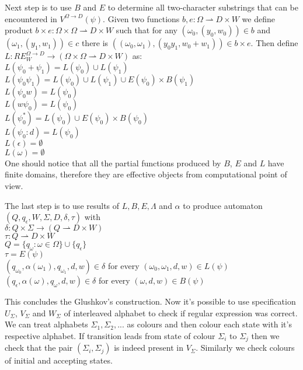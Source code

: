 \documentclass[journal]{journal}
\begin{document}
Next step is to use $B$ and $E$ to determine all two-character substrings that can be encountered in $V^{\Omega\rightarrow D}(\psi)$. Given two functions $b,e:\Omega \rightharpoonup D \times W$ we define product $b \times e : \Omega \times \Omega \rightharpoonup  D \times W$ such that for any $(\omega_0,(y_0,w_0))\in b$ and $(\omega_1,(y_1,w_1)) \in c$ there is $((\omega_0,\omega_1),(y_0y_1,w_0+w_1)) \in b\times e$. Then define $L:RE_W^{\Omega\rightarrow D} \rightarrow (\Omega \times \Omega \rightharpoonup  D \times W)$ as: \\
$L(\psi_0 + \psi_1) = L(\psi_0)\cup L(\psi_1) $ \\
$L(\psi_0 \psi_1) = L(\psi_0) \cup  L(\psi_1) \cup E(\psi_0) \times B(\psi_1)$ \\
$L(\psi_0 w) = L(\psi_0) $ \\
$L(w \psi_0 ) = L(\psi_0)$ \\
$L(\psi_0 ^*) =  L(\psi_0) \cup E(\psi_0) \times B(\psi_0)$ \\
$L(\psi_0 : d) =  L(\psi_0)$ \\
$L(\epsilon) =  \emptyset$ \\
$L(\omega) =  \emptyset$  \\
One should notice that all the partial functions produced by $B$, $E$ and $L$ have finite domains, therefore they are effective objects from computational point of view. 

The last step is to use results of $L,B,E,\Lambda$ and $\alpha$ to produce automaton $(Q,q_\epsilon,W,\Sigma,D,\delta,\tau)$ with \\
$\delta:Q \times \Sigma \rightarrow (Q\rightharpoonup D\times W)$ \\
$\tau:Q\rightharpoonup D \times W$ \\
$Q = \{q_\omega : \omega \in \Omega \} \cup \{q_\epsilon\}$ \\
$\tau = E(\psi)$ \\
$(q_{\omega_0},\alpha(\omega_1),q_{\omega_1},d,w)  \in \delta$ for every $(\omega_0,\omega_1,d,w) \in L(\psi) $ \\
$(q_\epsilon,\alpha(\omega),q_{\omega},d,w)  \in \delta$ for every $(\omega,d,w) \in B(\psi) $ 

This concludes the Glushkov's construction. Now it's possible to use specification $U_\Sigma$, $V_\Sigma$ and $W_\Sigma$ of interleaved alphabet to check if regular expression was correct. We can treat alphabets $\Sigma_1,\Sigma_2,...$ as colours and then colour each state with it's respective alphabet. If transition leads from state of colour $\Sigma_i$ to $\Sigma_j$ then we check that the pair $(\Sigma_i,\Sigma_j)$ is indeed present in $V_\Sigma$. Similarly we check colours of initial and accepting states.
\end{document}
